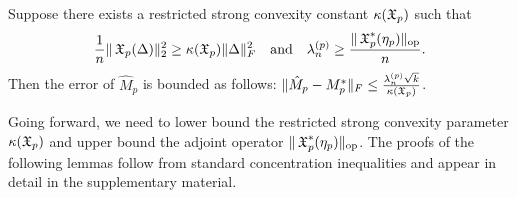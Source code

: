 



\begin{lemma}
\label{lem:lowRank}
Suppose there exists a restricted strong convexity constant $\kappa(\operatorname{\mathfrak{X}}_p)$ such that
$$\frac{1}{n} \| \operatorname{\mathfrak{X}}_p( \Delta )\|_2^2 \ge \kappa(\operatorname{\mathfrak{X}}_p) \|\Delta\|^2_F \quad \text{and} \quad
\lambda^{(p)}_n \ge \frac{\|\operatorname{\mathfrak{X}}_p^*(\eta_p)\|_{\textrm{op}}}{n}.$$
Then the error of $\hat M_p$ is bounded as follows:
$\| \hat M_p - M_p^* \|_F \le \frac{\lambda^{(p)}_n \sqrt{k}}{\kappa(\operatorname{\mathfrak{X}}_p)}$.
\end{lemma}

Going forward, we need to lower bound the restricted strong convexity
parameter $\kappa(\operatorname{\mathfrak{X}}_p)$ and upper bound the adjoint operator
$\|\operatorname{\mathfrak{X}}_p^*(\eta_p)\|_{\textrm{op}}$. The proofs of the following lemmas follow
from standard concentration inequalities and appear in detail in the
supplementary material.

